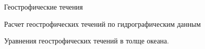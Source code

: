 \begin{chapter}{Геострофические течения}
\begin{section}{Расчет геострофических течений по гидрографическим данным}
\begin{paragraph}{Уравнения геострофических течений в толще океана.}


\end{paragraph}
\end{section}
\end{chapter}
